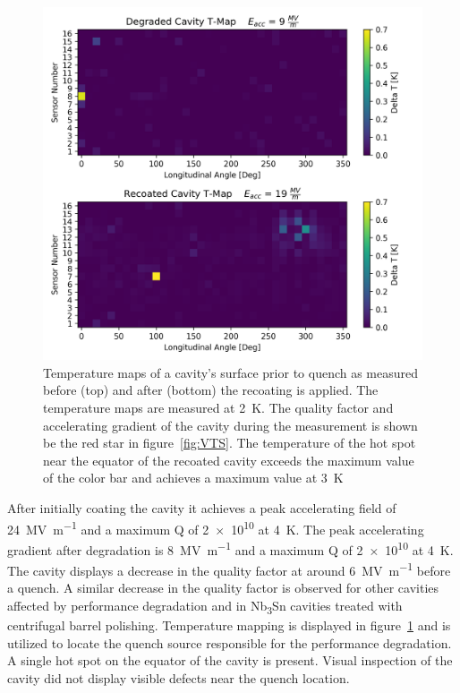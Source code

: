 \begin{figure}[h]%
    \centering%
    \includegraphics{./figures/TMAP.png}%
    \caption{Temperature maps of a cavity's surface prior to quench as measured before (top) and after (bottom) the recoating is applied. The temperature maps are measured at \qty{2}{\kelvin}. The quality factor and accelerating gradient of the cavity during the measurement is shown be the red star in figure~{\protect\ref{fig:VTS}}. The temperature of the hot spot near the equator of the recoated cavity exceeds the maximum value of the color bar and achieves a maximum value at \qty{3}{\kelvin}}%
    \label{fig:TMAP}%
\end{figure}

After initially coating the cavity it achieves a peak accelerating field of \qty{24}{\mega\volt\per\meter} and a maximum Q of \num{2e10} at \qty{4}{\kelvin}. The peak accelerating gradient after degradation is \qty{8}{\mega\volt\per\meter} and a maximum Q of \num{2e10} at \qty{4}{\kelvin}. The cavity displays a decrease in the quality factor at around \qty{6}{\mega\volt\per\meter} before a quench. A similar decrease in the quality factor is observed for other cavities affected by performance degradation\cite{eremeev2023preservation,eremeev:srf2019-mop015} and in Nb\textsubscript{3}Sn cavities treated with centrifugal barrel polishing\cite{viklund2024improving}. Temperature mapping is displayed in figure~\ref{fig:TMAP} and is utilized to locate the quench source responsible for the performance degradation. A single hot spot on the equator of the cavity is present. Visual inspection of the cavity did not display visible defects near the quench location.

